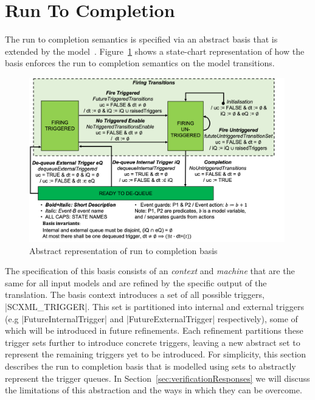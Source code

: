 

\section{Run To Completion}
\label{sec:run-completion}
The run to completion semantics is specified via an abstract basis that is extended by the model~\cite{MoSnHo18,MoSnHo-ABZ2020}. 
Figure~\ref{fig:basis} shows a state-chart representation of how the basis enforces 
the run to completion semantics on the model transitions. 

\begin{figure}[!h]
	\vspace{-.4cm}
	\centering
	\includegraphics[width=0.99\textwidth, trim=30 50 60 0]{figures/Picture6.png}
	\caption{Abstract representation of run to completion basis}
	\label{fig:basis}
	\vspace{-.4cm}
\end{figure}

The specification of this basis consists of an \EVENTB \emph{context} and \emph{machine} that are 
the same for all input models and are refined by the specific output of the translation.  
The basis context introduces a set of all possible triggers, |SCXML_TRIGGER|.  
This set is partitioned into internal and external triggers 
(e.g |FutureInternalTrigger| and |FutureExternalTrigger| respectively), 
some of which will be introduced in future refinements. 
Each refinement partitions these trigger sets further to introduce concrete triggers, 
leaving a new abstract set to represent the remaining triggers yet to be introduced. 
For simplicity, this section describes the run to completion basis 
that is modelled using sets to abstractly represent the trigger queues. 
In Section~\ref{sec:verificationResponses} we will discuss the limitations of this 
abstraction and the ways in which they can be overcome.

